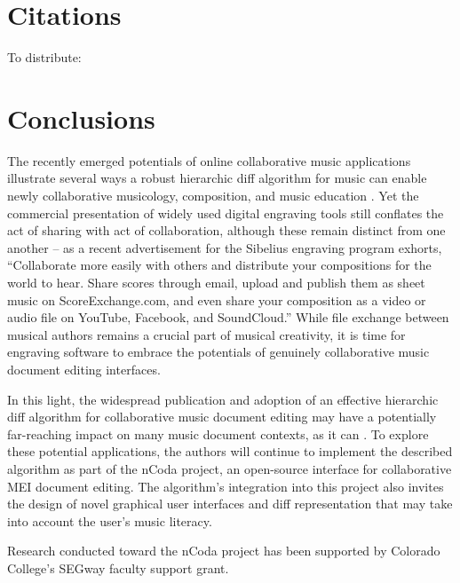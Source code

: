 \documentclass{article}
\begin{document}
\section{Citations}
To distribute: \cite{Bille:2005ec,Chawathe:1996jb,Cobena:2002gd,Designs:qm,McCulloch:2015pd,roland2002music,Zhang:1989ec,Zhang:1989il}

\section{Conclusions}
The recently emerged potentials of online collaborative music applications illustrate several ways a robust hierarchic diff algorithm for music can enable newly collaborative musicology, composition, and music education \cite{wust2001architectural,Martin:2015pb}. Yet the commercial presentation of widely used digital engraving tools still conflates the act of sharing with act of collaboration, although these remain distinct from one another -- as a recent advertisement for the Sibelius engraving program exhorts, ``Collaborate more easily with others and distribute your compositions for the world to hear. Share scores through email, upload and publish them as sheet music on ScoreExchange.com, and even share your composition as a video or audio file on YouTube, Facebook, and SoundCloud.'' While file exchange between musical authors remains a crucial part of musical creativity, it is time for engraving software to embrace the potentials of genuinely collaborative music document editing interfaces.

In this light, the widespread publication and adoption of an effective hierarchic diff algorithm for collaborative music document editing may have a potentially far-reaching impact on many music document contexts, as it can . To explore these potential applications, the authors will continue to implement the described algorithm as part of the nCoda project, an open-source interface for collaborative MEI document editing. The algorithm's integration into this project also invites the design of novel graphical user interfaces and diff representation that may take into account the user's music literacy.

%
\begin{acknowledgments}
Research conducted toward the nCoda project has been supported by Colorado College's SEGway faculty support grant.
\end{acknowledgments} 

\balance

\end{document}
